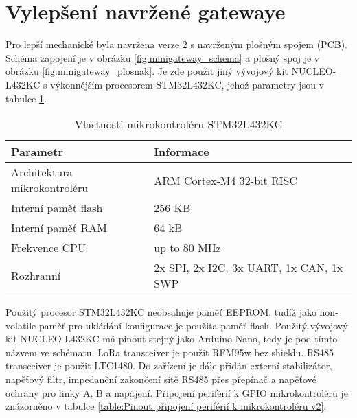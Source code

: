 \section{Vylepšení navržené gatewaye}
Pro lepší mechanické \DIFdelbegin {}\DIFdelend \DIFaddbegin {}\DIFaddend byla navržena verze 2 s navrženým plošným spojem (PCB).
Schéma zapojení je v obrázku \ref{fig:minigateway_schema} a plošný spoj je v obrázku \ref{fig:minigateway_plosnak}.
Je zde použit jiný vývojový kit NUCLEO-L432KC \cite{nucleo-l432KC_ST} s výkonnějším procesorem STM32L432KC, jehož parametry jsou v tabulce \ref{tab:mcuFeatures_stm43l432kc}. 

\begin{longtable}{|l|p{3.5cm}|}
    \caption{Vlastnosti mikrokontroléru STM32L432KC \cite{nucleo-l432KC_ST}}
    \label{tab:mcuFeatures_stm43l432kc} \\
    \hline

    Parametr          & Informace            \\ \hline \hline

    Architektura mikrokontroléru & ARM Cortex-M4 32-bit RISC \\ \hline
    Interní paměť flash       & 256 KB \\ \hline
    Interní paměť RAM         & 64 kB \\ \hline
    Frekvence CPU               & up to 80 MHz \\ \hline
    Rozhranní                  & 2x SPI, 2x I2C, 3x UART, 1x CAN, 1x SWP \\ \hline

\end{longtable}

Použitý procesor STM32L432KC neobsahuje paměť EEPROM, tudíž jako non-volatile paměť pro ukládání konfigurace je použita paměť flash.
Použitý vývojový kit NUCLEO-L432KC má pinout stejný jako Arduino Nano, tedy je pod tímto názvem ve schématu.
LoRa transceiver je použit RFM95w \cite{RFM95w} bez shieldu.
RS485 transceiver je použit LTC1480. 
Do zařízení je dále přidán externí stabilizátor, napěťový filtr, impedanční zakončení sítě RS485 přes přepínač a napěťové ochrany pro linky A, B a napájení. 
Připojení periférií k GPIO mikrokontroléru je znázorněno v tabulce \ref{table:Pinout připojení periférií k mikrokontroléru v2}.

